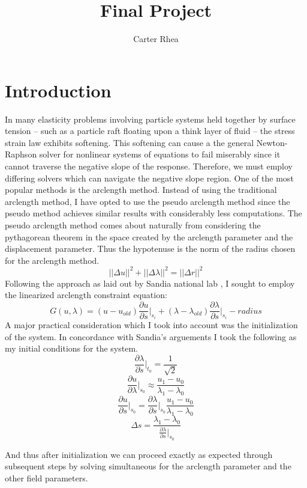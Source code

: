 \documentclass[10pt,a4paper]{article}
\author{Carter Rhea}
\title{Final Project}
\begin{document}
	\maketitle
	\newpage
	
	\section{Introduction}
	In many elasticity problems involving particle systems held together by surface tension -- such as a particle raft floating upon a think layer of fluid -- the stress strain law exhibits softening. This softening can cause a the general Newton-Raphson solver for nonlinear systems of equations to fail miserably since it cannot traverse the negative slope of the response. Therefore, we must employ differing solvers which can navigate the negative slope region. One of the most popular methods is the arclength method. Instead of using the traditional arclength method, I have opted to use the pseudo arclength method since the pseudo method achieves similar results with considerably less computations. The pseudo arclength method comes about naturally from considering the pythagorean theorem in the space created by the arclength parameter and the displacement parameter. Thus the hypotenuse is the norm of the radius chosen for the arclength method.
		$$||\Delta u||^2 + ||\Delta \lambda||^2 = ||\Delta r||^2 $$
	 Following the approach as laid out by Sandia national lab \cite{arclength}, I sought to employ the linearized arclength constraint equation:
	$$G(u,\lambda) = (u-u_{old})\frac{\partial u}{\partial s}\Big|_{s_i}+(\lambda-\lambda_{old})\frac{\partial \lambda}{\partial s}\Big|_{s_i} - radius$$
	A major practical consideration which I took into account was the initialization of the system.  In concordance with Sandia's arguements I took the following as my initial conditions for the system.		
	$$\frac{\partial \lambda}{\partial s} \Big|_{t_0} = \frac{1}{\sqrt{2}}$$
	$$\frac{\partial u}{\partial \lambda}\Big|_{s_0} \approx \frac{u_1-u_0}{\lambda_1-\lambda_0} $$ 
	$$\frac{\partial u}{\partial s}\Big|_{s_0} = \frac{\partial \lambda}{\partial s}\Big|_{s_0} \frac{u_1-u_0}{\lambda_1-\lambda_0} $$
	$$\Delta s = \frac{\lambda_1-\lambda_0}{\frac{\partial \lambda}{\partial s}\Big|_{s_0}} $$
	
	And thus after initialization we can proceed exactly as expected through subsequent steps by solving simultaneous for the arclength parameter and the other field parameters.
	
	\newpage
\end{document}
